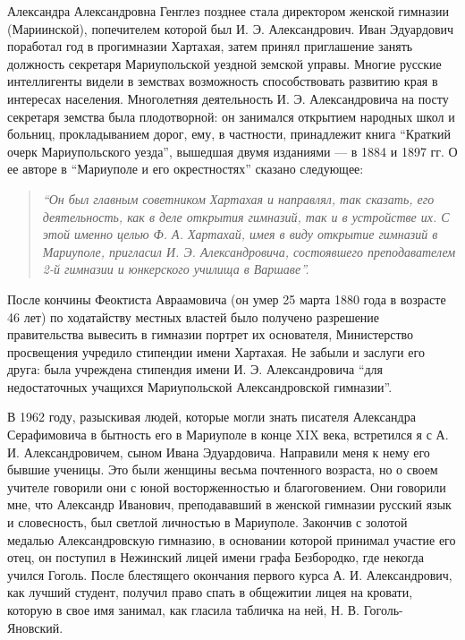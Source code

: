 
Александра Александровна Генглез позднее стала директором женской гимназии
(Мариинской), попечителем которой был И. Э. Александрович. Иван Эдуардович
поработал год в прогимназии Хартахая, затем принял приглашение занять должность
секретаря Мариупольской уездной земской управы. Многие русские интеллигенты
видели в земствах возможность способствовать развитию края в интересах
населения. Многолетняя деятельность И. Э. Александровича на посту секретаря
земства была плодотворной: он занимался открытием народных школ и больниц,
прокладыванием дорог, ему, в частности, принадлежит книга \enquote{Краткий очерк
Мариупольского уезда}, вышедшая двумя изданиями — в 1884 и 1897 гг. О ее авторе
в \enquote{Мариуполе и его окрестностях} сказано следующее: 

\begin{quote}
\em\enquote{Он был главным советником
Хартахая и направлял, так сказать, его деятельность, как в деле открытия
гимназий, так и в устройстве их. С этой именно целью Ф. А. Хартахай, имея в
виду открытие гимназий в Мариуполе, пригласил И. Э. Александровича, состоявшего
преподавателем 2-й гимназии и юнкерского училища в Варшаве}.
\end{quote}

После кончины Феоктиста Авраамовича (он умер 25 марта 1880 года в возрасте 46
лет) по ходатайству местных властей было получено разрешение правительства
вывесить в гимназии портрет их основателя, Министерство просвещения учредило
стипендии имени Хартахая. Не забыли и заслуги его друга: была учреждена
стипендия имени И. Э. Александровича \enquote{для недостаточных учащихся Мариупольской
Александровской гимназии}.

В 1962 году, разыскивая людей, которые могли знать писателя Александра
Серафимовича в бытность его в Мариуполе в конце XIX века, встретился я с А. И.
Александровичем, сыном Ивана Эдуардовича. Направили меня к нему его бывшие
ученицы. Это были женщины весьма почтенного возраста, но о своем учителе
говорили они с юной восторженностью и благоговением. Они говорили мне, что
Александр Иванович, преподававший в женской гимназии русский язык и
словесность, был светлой личностью в Мариуполе. Закончив с золотой медалью
Александровскую гимназию, в основании которой принимал участие его отец, он
поступил в Нежинский лицей имени графа Безбородко, где некогда учился Гоголь.
После блестящего окончания первого курса А. И. Александрович, как лучший
студент, получил право спать в общежитии лицея на кровати, которую в свое имя
занимал, как гласила табличка на ней, Н. В. Гоголь-Яновский.

